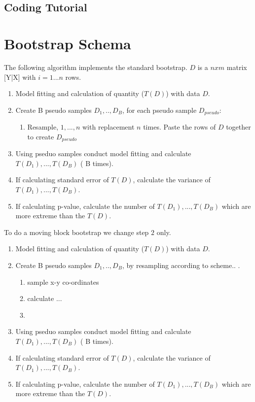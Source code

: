 \documentclass[a4paper,12pt]{article}
\begin{document}
\subsection{Coding Tutorial}

\section{Bootstrap Schema}
The following algorithm implements the standard bootstrap. 
$D$ is a $nxm$ matrix [Y|X] with $i=1...n$ rows.
\begin{enumerate}
\item Model fitting and calculation of quantity ($T(D)$) with data $D$.
\item Create B pseudo samples $D_1,..,D_B$, for each pseudo sample $D_{pseudo}$:
\begin{enumerate}
\item Resample, $1,...,n$ with replacement $n$ times. Paste the rows of $D$ together to create $D_{pseudo}$ 
\end{enumerate} 
\item Using pseduo samples conduct model fitting and calculate $T(D_1),...,T(D_B)$ ( B times). 
\item If calculating standard error of $T(D)$, calculate the variance of $T(D_1),...,T(D_B)$.
\item If calculating p-value, calculate the number of $T(D_1),...,T(D_B)$ which are more extreme than the $T(D)$. 
\end{enumerate}
To do a moving block bootstrap we change step $2$ only.
\begin{enumerate}
\item Model fitting and calculation of quantity ($T(D)$) with data $D$.
\item Create B pseudo samples $D_1,..,D_B$, by resampling according to scheme.. .  
\begin{enumerate}
\item sample x-y co-ordinates
\item calculate ...
\item 
\end{enumerate}
\item Using pseduo samples conduct model fitting and calculate $T(D_1),...,T(D_B)$ ( B times). 
\item If calculating standard error of $T(D)$, calculate the variance of $T(D_1),...,T(D_B)$.
\item If calculating p-value, calculate the number of $T(D_1),...,T(D_B)$ which are more extreme than the $T(D)$. 
\end{enumerate}
\end{document}
